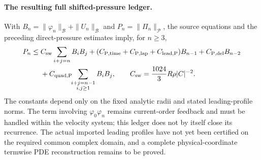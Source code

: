 \paragraph{The resulting full shifted-pressure ledger.}
With $B_n=\|\varphi_n\|_{\mathcal B}+\|U_n\|_{\mathcal B}$
and $P_n=\|\Pi_n\|_{\mathcal P}$, the source equations
and the preceding direct-pressure estimates imply, for $n\ge3$,
\begin{align}\label{eq:complete-two-space-P-ledger}
 P_n\le{}& C_{\rm sw}\sum_{i+j=n}B_iB_j
 +(C_{\rm P,time}+C_{\rm P,lap}+C_{\rm lead,P})B_{n-1}
 +C_{\rm P,del}B_{n-2}\notag\\
 &+C_{\rm quad,P}\!\!\sum_{\substack{i+j=n-1\\i,j\ge1}}
 B_iB_j,\qquad
 C_{\rm sw}=\frac{1024}{3}R\rho |C|^{-2}.
\end{align}
The constants depend only on the fixed analytic radii and
stated leading-profile norms. The term involving
$\varphi_0\varphi_n$ remains current-order feedback and must
be handled within the velocity system; this ledger does not
by itself close its recurrence. The actual imported leading
profiles have not yet been certified on the required common
complex domain, and a complete physical-coordinate
termwise PDE reconstruction remains to be proved.
